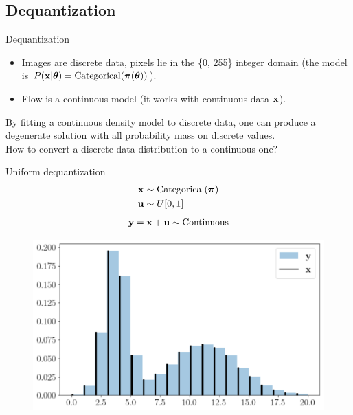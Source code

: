 \subsection{Dequantization}
\begin{frame}{Dequantization}
	\begin{itemize}
		\item Images are discrete data, pixels lie in the \{0, 255\} integer domain (the model is $P(\mathbf{x} | \boldsymbol{\theta}) = \text{Categorical}(\boldsymbol{\pi}(\boldsymbol{\theta}))$).
		\item Flow is a continuous model (it works with continuous data $\mathbf{x}$).
	\end{itemize}
	By fitting a continuous density model to discrete data, one can produce a degenerate solution with all probability mass on discrete values. \\
	How to convert a discrete data distribution to a continuous one?
	
	\begin{minipage}[t]{0.5\columnwidth}
		\begin{block}{Uniform dequantization}
			\vspace{-0.5cm}
			\begin{align*}
				\mathbf{x} &\sim \text{Categorical}(\boldsymbol{\pi}) \\
				\mathbf{u} &\sim U[0, 1]
			\end{align*}
			\[
			\mathbf{y} = \mathbf{x} + \mathbf{u} \sim \text{Continuous} 
			\]
		\end{block}
	\end{minipage}%
	\begin{minipage}[t]{0.5\columnwidth}
		\begin{figure}
			\centering
			\includegraphics[width=1.0\linewidth]{figs/uniform_dequantization.png}
		\end{figure}
	\end{minipage}
\end{frame}

